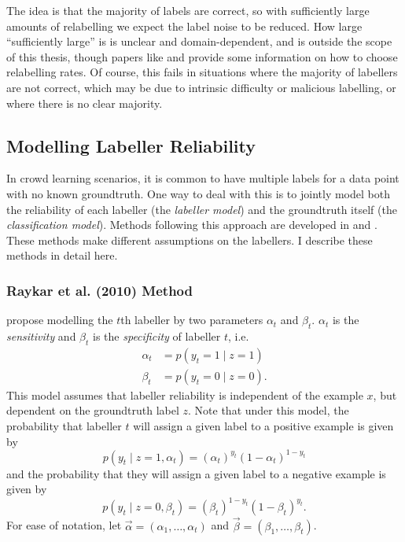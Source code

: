         The idea is that the majority of labels are correct, so with sufficiently large amounts of relabelling we expect the label noise to be reduced. How large ``sufficiently large'' is is unclear and domain-dependent, and is outside the scope of this thesis, though papers like \citet{sheng08} and \citet{lin16} provide some information on how to choose relabelling rates. Of course, this fails in situations where the majority of labellers are not correct, which may be due to intrinsic difficulty or malicious labelling, or where there is no clear majority.

    \subsection{Modelling Labeller Reliability}

        In crowd learning scenarios, it is common to have multiple labels for a data point with no known groundtruth. One way to deal with this is to jointly model both the reliability of each labeller (the \emph{labeller model}) and the groundtruth itself (the \emph{classification model}). Methods following this approach are developed in \citet{raykar10} and \citet{yan10}. These methods make different assumptions on the labellers. I describe these methods in detail here.

        \subsubsection{Raykar et al. (2010) Method}

            \citet{raykar10} propose modelling the $t$th labeller by two parameters $\alpha_t$ and $\beta_t$. $\alpha_t$ is the \emph{sensitivity} and $\beta_t$ is the \emph{specificity} of labeller $t$, i.e.
            \begin{align*}
                \alpha_t &= p(y_t = 1 \mid z = 1)\\
                \beta_t &= p(y_t = 0 \mid z = 0).
            \end{align*}
            This model assumes that labeller reliability is independent of the example $x$, but dependent on the groundtruth label $z$. Note that under this model, the probability that labeller $t$ will assign a given label to a positive example is given by
            \begin{equation*}
                p(y_t \mid z = 1, \alpha_t) = (\alpha_t)^{y_t} (1 - \alpha_t)^{1 - y_t}
            \end{equation*}
            and the probability that they will assign a given label to a negative example is given by
            \begin{equation*}
                p(y_t \mid z = 0, \beta_t) = (\beta_t)^{1 - y_t} (1 - \beta_t)^{y_t}.
            \end{equation*}
            For ease of notation, let $\vec \alpha = (\alpha_1, \dots, \alpha_t)$ and $\vec \beta = (\beta_1, \dots, \beta_t)$.


